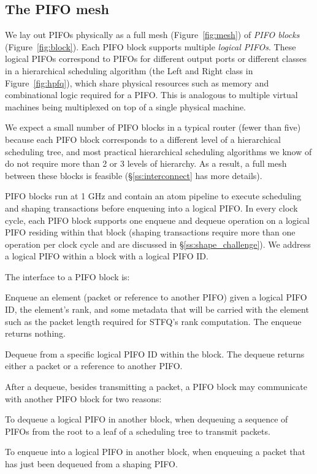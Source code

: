 \subsection{The PIFO mesh}
\label{ss:mesh}

We lay out PIFOs physically as a full mesh (Figure~\ref{fig:mesh}) of {\em PIFO
blocks} (Figure~\ref{fig:block}). Each PIFO block supports multiple {\em
logical PIFOs}. These logical PIFOs correspond to PIFOs for different output
ports or different classes in a hierarchical scheduling algorithm (\eg the Left
and Right class in Figure~\ref{fig:hpfq}), which share physical resources such
as memory and combinational logic required for a PIFO.  This is analogous to
multiple virtual machines being multiplexed on top of a single physical
machine.

We expect a small number of PIFO blocks in a typical router (\eg fewer than
five) because each PIFO block corresponds to a different level of a
hierarchical scheduling tree, and most practical hierarchical scheduling
algorithms we know of do not require more than 2 or 3 levels of hierarchy. As a
result, a full mesh between these blocks is feasible (\S\ref{ss:interconnect}
has more details).

PIFO blocks run at 1 GHz and contain an atom pipeline to execute scheduling and
shaping transactions before enqueuing into a logical PIFO. In every clock
cycle, each PIFO block supports one enqueue and dequeue operation on a logical
PIFO residing within that block (shaping transactions require more than one
operation per clock cycle and are discussed in \S\ref{ss:shape_challenge}). We
address a logical PIFO within a block with a logical PIFO ID.

The interface to a PIFO block is:
\begin{CompactEnumerate}
\item Enqueue an element (packet or reference to another PIFO) given a
  logical PIFO ID, the element's rank, and some metadata that will be
  carried with the element such as the packet length required for
  STFQ's rank computation. The enqueue returns nothing.
\item Dequeue from a specific logical PIFO ID within the block. The dequeue
  returns either a packet or a reference to another PIFO.
\end{CompactEnumerate}

After a dequeue, besides transmitting a packet, a PIFO block may communicate
with another PIFO block for two reasons:
 \begin{CompactEnumerate}
 \item To dequeue a logical PIFO in another block, \eg when dequeuing a
   sequence of PIFOs from the root to a leaf of a scheduling tree to transmit
   packets.
 
 \item To enqueue into a logical PIFO in another block, \eg when
   enqueuing a packet that has just been dequeued from a shaping
   PIFO.
 \end{CompactEnumerate}

